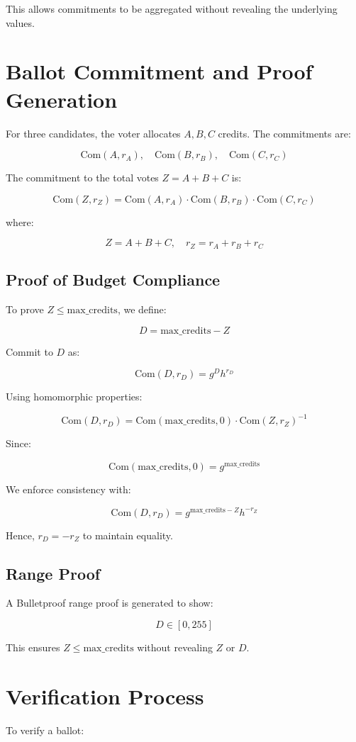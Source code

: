 \documentclass{article}
\begin{document}
This allows commitments to be aggregated without revealing the underlying values.

\section{Ballot Commitment and Proof Generation}
For three candidates, the voter allocates \( A, B, C \) credits. The commitments are:

\[
\text{Com}(A, r_A), \quad \text{Com}(B, r_B), \quad \text{Com}(C, r_C)
\]

The commitment to the total votes \( Z = A + B + C \) is:

\[
\text{Com}(Z, r_Z) = \text{Com}(A, r_A) \cdot \text{Com}(B, r_B) \cdot \text{Com}(C, r_C)
\]

where:

\[
Z = A + B + C, \quad r_Z = r_A + r_B + r_C
\]

\subsection{Proof of Budget Compliance}
To prove \( Z \leq \text{max\_credits} \), we define:

\[
D = \text{max\_credits} - Z
\]

Commit to \( D \) as:

\[
\text{Com}(D, r_D) = g^D h^{r_D}
\]

Using homomorphic properties:

\[
\text{Com}(D, r_D) = \text{Com}(\text{max\_credits}, 0) \cdot \text{Com}(Z, r_Z)^{-1}
\]

Since:

\[
\text{Com}(\text{max\_credits}, 0) = g^{\text{max\_credits}}
\]

We enforce consistency with:

\[
\text{Com}(D, r_D) = g^{\text{max\_credits} - Z} h^{-r_Z}
\]

Hence, \( r_D = -r_Z \) to maintain equality.

\subsection{Range Proof}
A Bulletproof range proof is generated to show:

\[
D \in [0, 255]
\]

This ensures \( Z \leq \text{max\_credits} \) without revealing \( Z \) or \( D \).

\section{Verification Process}
To verify a ballot:
\end{document}
